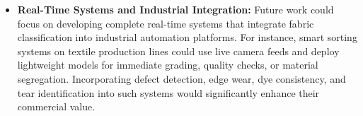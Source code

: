 \begin{itemize}
    \item \textbf{Real-Time Systems and Industrial Integration:} Future work could focus on developing complete real-time systems that integrate fabric classification into industrial automation platforms. For instance, smart sorting systems on textile production lines could use live camera feeds and deploy lightweight models for immediate grading, quality checks, or material segregation. Incorporating defect detection, edge wear, dye consistency, and tear identification into such systems would significantly enhance their commercial value.
\end{itemize}
